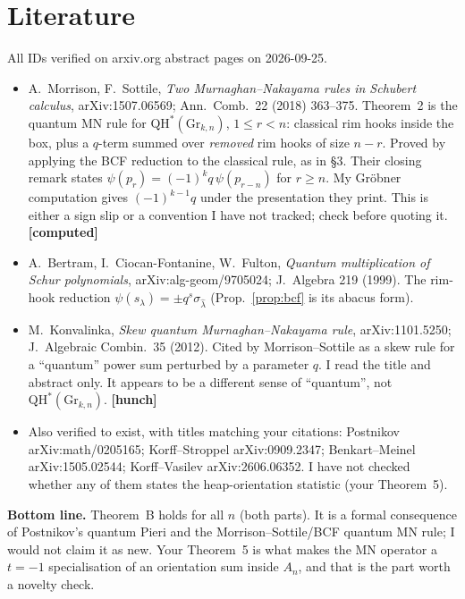 \documentclass[11pt]{article}
\theoremstyle{remark}
\newcommand{\QH}{\mathrm{QH}^*(\mathrm{Gr}_{k,n})}
\newcommand{\grade}[1]{\textbf{[#1]}}
\begin{document}
\section{Literature}
All IDs verified on arxiv.org abstract pages on 2026-09-25.
\begin{itemize}
\item A.~Morrison, F.~Sottile, \emph{Two Murnaghan--Nakayama rules in Schubert calculus}, arXiv:1507.06569; Ann.\ Comb.\ 22 (2018)
  363--375. Theorem~2 is the quantum MN rule for $\QH$, $1\le r<n$: classical rim hooks inside the box, plus a $q$-term summed over
  \emph{removed} rim hooks of size $n-r$. Proved by applying the BCF reduction to the classical rule, as in \S3. Their closing
  remark states $\psi(p_r)=(-1)^kq\,\psi(p_{r-n})$ for $r\ge n$. My Gr\"obner computation gives $(-1)^{k-1}q$ under the
  presentation they print. This is either a sign slip or a convention I have not tracked; check before quoting it. \grade{computed}
\item A.~Bertram, I.~Ciocan-Fontanine, W.~Fulton, \emph{Quantum multiplication of Schur polynomials}, arXiv:alg-geom/9705024;
  J.\ Algebra 219 (1999). The rim-hook reduction $\psi(s_\lambda)=\pm q^s\sigma_{\hat\lambda}$ (Prop.~\ref{prop:bcf} is its
  abacus form).
\item M.~Konvalinka, \emph{Skew quantum Murnaghan--Nakayama rule}, arXiv:1101.5250; J.\ Algebraic Combin.\ 35 (2012). Cited by
  Morrison--Sottile as a skew rule for a ``quantum'' power sum perturbed by a parameter $q$. I read the title and abstract
  only. It appears to be a different sense of ``quantum'', not $\QH$. \grade{hunch}
\item Also verified to exist, with titles matching your citations: Postnikov arXiv:math/0205165; Korff--Stroppel arXiv:0909.2347;
  Benkart--Meinel arXiv:1505.02544; Korff--Vasilev arXiv:2606.06352. I have not checked whether any of them states the
  heap-orientation statistic (your Theorem~5).
\end{itemize}

\noindent\textbf{Bottom line.} Theorem~B holds for all $n$ (both parts). It is a formal consequence of Postnikov's quantum Pieri
and the Morrison--Sottile/BCF quantum MN rule; I would not claim it as new. Your Theorem~5 is what makes the MN operator a
$t=-1$ specialisation of an orientation sum inside $A_n$, and that is the part worth a novelty check.
\end{document}
